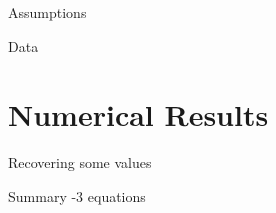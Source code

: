 \documentclass[9pt]{beamer}
\begin{document}
\begin{frame}{Assumptions}

\end{frame}

\begin{frame}{Data}

\end{frame}

\section{Numerical Results}

\begin{frame}{Recovering some values}
\end{frame}

\begin{frame}{Summary}
-3 equations
\end{frame}
\end{document}
